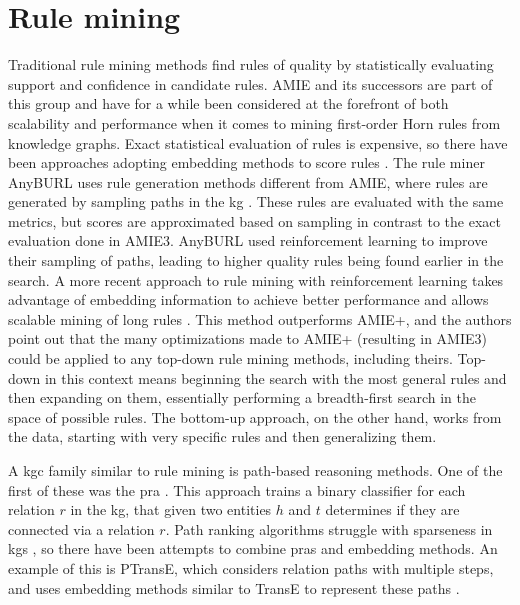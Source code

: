 \section{Rule mining}
Traditional rule mining methods find rules of quality by statistically evaluating support and confidence in candidate rules. AMIE and its successors are part of this group and have for a while been considered at the forefront of both scalability and performance when it comes to mining first-order Horn rules from knowledge graphs. Exact statistical evaluation of rules is expensive, so there have been approaches adopting embedding methods to score rules \cite{yang2014embedding, omran2018scalable, omran2019embedding}. The rule miner AnyBURL uses rule generation methods different from AMIE, where rules are generated by sampling paths in the \gls{kg} \cite{meilicke2020reinforced}. These rules are evaluated with the same metrics, but scores are approximated based on sampling in contrast to the exact evaluation done in AMIE3. AnyBURL used reinforcement learning to improve their sampling of paths, leading to higher quality rules being found earlier in the search. A more recent approach to rule mining with reinforcement learning takes advantage of embedding information to achieve better performance and allows scalable mining of long rules \cite{chen2022rule}. This method outperforms AMIE+, and the authors point out that the many optimizations made to AMIE+ (resulting in AMIE3) could be applied to any top-down rule mining methods, including theirs. Top-down in this context means beginning the search with the most general rules and then expanding on them, essentially performing a breadth-first search in the space of possible rules. The bottom-up approach, on the other hand, works from the data, starting with very specific rules and then generalizing them.

A \gls{kgc} family similar to rule mining is path-based reasoning methods. One of the first of these was the \gls{pra} \cite{lao2011random}. This approach trains a binary classifier for each relation $r$ in the \gls{kg}, that given two entities $h$ and $t$ determines if they are connected via a relation $r$. Path ranking algorithms struggle with sparseness in \glspl{kg} \cite{ma2019elpkg}, so there have been attempts to combine \glspl{pra} and embedding methods. An example of this is PTransE, which considers relation paths with multiple steps, and uses embedding methods similar to TransE to represent these paths \cite{lin2015modeling}.  %


